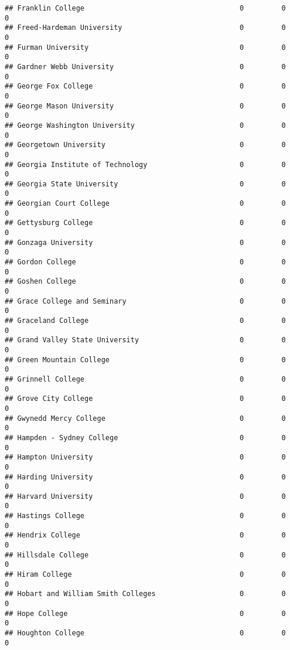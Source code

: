\documentclass[
]{article}
\begin{document}
\begin{verbatim}
## Franklin College                                     0         0           0
## Freed-Hardeman University                            0         0           0
## Furman University                                    0         0           0
## Gardner Webb University                              0         0           0
## George Fox College                                   0         0           0
## George Mason University                              0         0           0
## George Washington University                         0         0           0
## Georgetown University                                0         0           0
## Georgia Institute of Technology                      0         0           0
## Georgia State University                             0         0           0
## Georgian Court College                               0         0           0
## Gettysburg College                                   0         0           0
## Gonzaga University                                   0         0           0
## Gordon College                                       0         0           0
## Goshen College                                       0         0           0
## Grace College and Seminary                           0         0           0
## Graceland College                                    0         0           0
## Grand Valley State University                        0         0           0
## Green Mountain College                               0         0           0
## Grinnell College                                     0         0           0
## Grove City College                                   0         0           0
## Gwynedd Mercy College                                0         0           0
## Hampden - Sydney College                             0         0           0
## Hampton University                                   0         0           0
## Harding University                                   0         0           0
## Harvard University                                   0         0           0
## Hastings College                                     0         0           0
## Hendrix College                                      0         0           0
## Hillsdale College                                    0         0           0
## Hiram College                                        0         0           0
## Hobart and William Smith Colleges                    0         0           0
## Hope College                                         0         0           0
## Houghton College                                     0         0           0

\end{verbatim}
\end{document}
